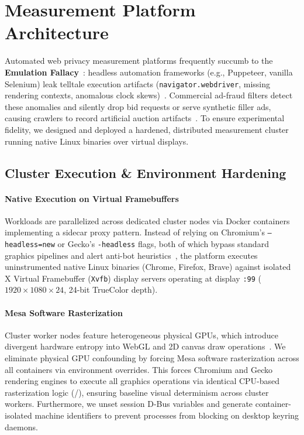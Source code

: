 \section{Measurement Platform Architecture}
\label{sec:platform}

Automated web privacy measurement platforms frequently succumb to the \textbf{Emulation Fallacy}~\cite{cassel2022omnicrawl}: headless automation frameworks (e.g., Puppeteer, vanilla Selenium) leak telltale execution artifacts (\texttt{navigator.webdriver}, missing rendering contexts, anomalous clock skews)~\cite{vastel2020fp}. 
Commercial ad-fraud filters detect these anomalies and silently drop bid requests or serve synthetic filler ads, causing crawlers to record artificial auction artifacts~\cite{ahmad2020apophanies, demir2022reproducibility}. 
To ensure experimental fidelity, we designed and deployed a hardened, distributed measurement cluster running native Linux binaries over virtual displays.

\subsection{Cluster Execution \& Environment Hardening}
\label{subsec:cluster_hardening}

\paragraph{Native Execution on Virtual Framebuffers}
Workloads are parallelized across dedicated cluster nodes via Docker containers implementing a sidecar proxy pattern. Instead of relying on Chromium's \texttt{--headless=new} or Gecko's \texttt{-headless} flags, both of which bypass standard graphics pipelines and alert anti-bot heuristics~\cite{cassel2022omnicrawl, vastel2020fp}, the platform executes uninstrumented native Linux binaries (Chrome, Firefox, Brave) against isolated X Virtual Framebuffer (\texttt{Xvfb}) display servers operating at display \texttt{:99} ($1920 \times 1080 \times 24$, 24-bit TrueColor depth).

\paragraph{Mesa Software Rasterization}
Cluster worker nodes feature heterogeneous physical GPUs, which introduce divergent hardware entropy into WebGL and 2D canvas draw operations~\cite{mowery2012pixel, cao2017cross}. 
We eliminate physical GPU confounding by forcing Mesa software rasterization across all containers via environment overrides. 
This forces Chromium and Gecko rendering engines to execute all graphics operations via identical CPU-based rasterization logic (/), ensuring baseline visual determinism across cluster workers. 
Furthermore, we unset session D-Bus variables and generate container-isolated machine identifiers to prevent processes from blocking on desktop keyring daemons.

